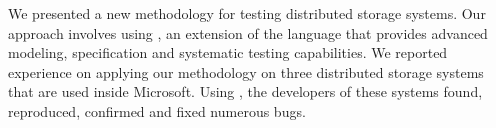We presented a new methodology for testing distributed storage systems. Our approach involves using \psharp, an extension of the \csharp language that provides advanced modeling, specification and systematic testing capabilities. We reported experience on applying our methodology on three distributed storage systems that are used inside Microsoft. Using \psharp, the developers of these systems found, reproduced, confirmed and fixed numerous bugs.